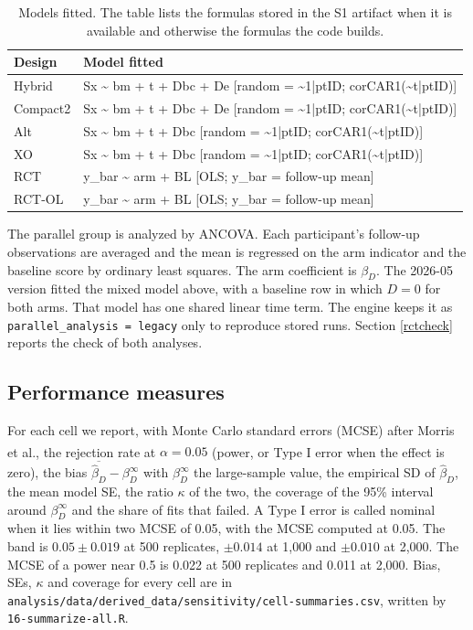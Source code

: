 \documentclass[
  11pt,
]{article}
\begin{document}
\begin{table}

\caption{\label{tab:formulas}Models fitted. The table lists the formulas stored in the S1 artifact when it is available and otherwise the formulas the code builds.}
\centering
\begin{tabular}[t]{ll}
\toprule
Design & Model fitted\\
\midrule
Hybrid & Sx \textasciitilde{} bm + t + Dbc + De [random = \textasciitilde{}1|ptID; corCAR1(\textasciitilde{}t|ptID)]\\
Compact2 & Sx \textasciitilde{} bm + t + Dbc + De [random = \textasciitilde{}1|ptID; corCAR1(\textasciitilde{}t|ptID)]\\
Alt & Sx \textasciitilde{} bm + t + Dbc [random = \textasciitilde{}1|ptID; corCAR1(\textasciitilde{}t|ptID)]\\
XO & Sx \textasciitilde{} bm + t + Dbc [random = \textasciitilde{}1|ptID; corCAR1(\textasciitilde{}t|ptID)]\\
RCT & y\_bar \textasciitilde{} arm + BL [OLS; y\_bar = follow-up mean]\\
\addlinespace
RCT-OL & y\_bar \textasciitilde{} arm + BL [OLS; y\_bar = follow-up mean]\\
\bottomrule
\end{tabular}
\end{table}

The parallel group is analyzed by ANCOVA. Each participant's follow-up observations are averaged and the mean is regressed on the arm indicator and the baseline score by ordinary least squares. The arm coefficient is \(\beta_D\). The 2026-05 version fitted the mixed model above, with a baseline row in which \(D = 0\) for both arms. That model has one shared linear time term. The engine keeps it as \texttt{parallel\_analysis\ =\ \textquotesingle{}legacy\textquotesingle{}} only to reproduce stored runs. Section \ref{rctcheck} reports the check of both analyses.

\subsection{Performance measures}\label{perf}

For each cell we report, with Monte Carlo standard errors (MCSE) after Morris et al.\textsuperscript{}, the rejection rate at \(\alpha = 0.05\) (power, or Type I error when the effect is zero), the bias \(\overline{\hat\beta_D} - \beta_D^{\infty}\) with \(\beta_D^{\infty}\) the large-sample value, the empirical SD of \(\hat\beta_D\), the mean model SE, the ratio \(\kappa\) of the two, the coverage of the 95\% interval around \(\beta_D^{\infty}\) and the share of fits that failed. A Type I error is called nominal when it lies within two MCSE of 0.05, with the MCSE computed at 0.05. The band is \(0.05 \pm 0.019\) at 500 replicates, \(\pm 0.014\) at 1,000 and \(\pm 0.010\) at 2,000. The MCSE of a power near 0.5 is 0.022 at 500 replicates and 0.011 at 2,000. Bias, SEs, \(\kappa\) and coverage for every cell are in \texttt{analysis/data/derived\_data/sensitivity/cell-summaries.csv}, written by \texttt{16-summarize-all.R}.
\end{document}
